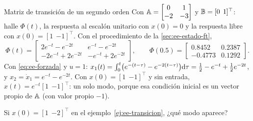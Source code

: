 \begin{ejemplo}[label=ej:ee-transicion]{Matriz de transición de un segundo orden}
Con $\mathbb{A}=\begin{bmatrix}0&1\\-2&-3\end{bmatrix}$ y $\mathbb{B}=[0\;\,1]^\top$: halle $\Phi(t)$, la respuesta al escalón unitario con $x(0)=0$ y la respuesta libre con $x(0)=[1\;\,{-1}]^\top$.
\solucion Con el procedimiento de la \cref{sec:ee-estado-ft},
\[
  \Phi(t)=\begin{bmatrix}2e^{-t}-e^{-2t} & e^{-t}-e^{-2t}\\-2e^{-t}+2e^{-2t} & -e^{-t}+2e^{-2t}\end{bmatrix},
  \qquad \Phi(0.5)=\begin{bmatrix}0.8452&0.2387\\-0.4773&0.1292\end{bmatrix}.
\]
Con \eqref{eq:ee-forzada} y $u=1$: $x_1(t)=\int_0^t\bigl(e^{-(t-\tau)}-e^{-2(t-\tau)}\bigr)\mathrm{d}\tau=\frac12-e^{-t}+\frac12e^{-2t}$, y $x_2=\dot x_1=e^{-t}-e^{-2t}$. Con $x(0)=[1\;\,{-1}]^\top$ y sin entrada, $x(t)=e^{-t}[1\;\,{-1}]^\top$: un solo modo, porque esa condición inicial es un vector propio de $\mathbb{A}$ (con valor propio $-1$).
\end{ejemplo}


\begin{pausa}
Si $x(0)=[1\;\,{-2}]^\top$ en el ejemplo~\ref{ej:ee-transicion}, ¿qué modo aparece?
\end{pausa}
